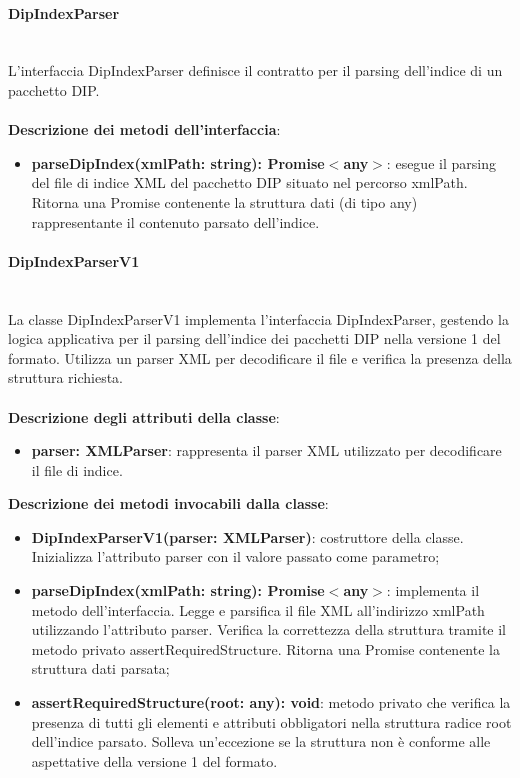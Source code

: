 \documentclass[a4paper,12pt]{article}
\begin{document}
{{{                \paragraph{DipIndexParser}\label{par:DipIndexParser}\mbox{}\\
                L'interfaccia DipIndexParser definisce il contratto per il parsing dell'indice di un pacchetto DIP.\\
                \\
                \noindent \textbf{Descrizione dei metodi dell'interfaccia}:
                \begin{itemize}
                    \item \textbf{parseDipIndex(xmlPath: string): Promise$<$any$>$}: esegue il parsing del file di indice XML del pacchetto DIP situato nel percorso xmlPath. Ritorna una Promise contenente la struttura dati (di tipo any) rappresentante il contenuto parsato dell'indice.
                \end{itemize}
                \paragraph{DipIndexParserV1}\label{par:DipIndexParserV1}\mbox{}\\
                La classe DipIndexParserV1 implementa l'interfaccia DipIndexParser, gestendo la logica applicativa per il parsing dell'indice dei pacchetti DIP nella versione 1 del formato. Utilizza un parser XML per decodificare il file e verifica la presenza della struttura richiesta.\\
                \\
                \textbf{Descrizione degli attributi della classe}:
                \begin{itemize}
                    \item \textbf{parser: XMLParser}: rappresenta il parser XML utilizzato per decodificare il file di indice.
                \end{itemize}
                
                \noindent \textbf{Descrizione dei metodi invocabili dalla classe}:
                \begin{itemize}
                    \item \textbf{DipIndexParserV1(parser: XMLParser)}: costruttore della classe. Inizializza l'attributo parser con il valore passato come parametro;
                    \item \textbf{parseDipIndex(xmlPath: string): Promise$<$any$>$}: implementa il metodo dell'interfaccia. Legge e parsifica il file XML all'indirizzo xmlPath utilizzando l'attributo parser. Verifica la correttezza della struttura tramite il metodo privato assertRequiredStructure. Ritorna una Promise contenente la struttura dati parsata;
                    \item \textbf{assertRequiredStructure(root: any): void}: metodo privato che verifica la presenza di tutti gli elementi e attributi obbligatori nella struttura radice root dell'indice parsato. Solleva un'eccezione se la struttura non è conforme alle aspettative della versione 1 del formato.
                \end{itemize}
}}}
\end{document}
